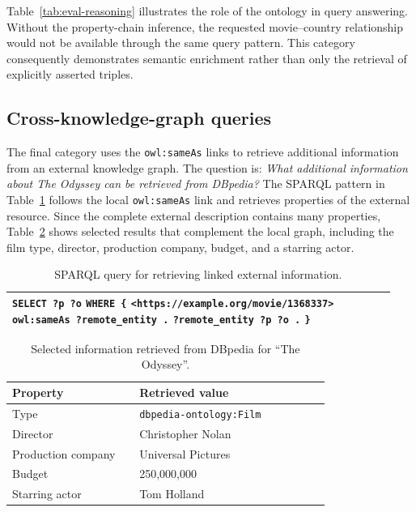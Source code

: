 Table~\ref{tab:eval-reasoning} illustrates the role of the ontology in
query answering. Without the property-chain inference, the requested
movie--country relationship would not be available through the same query
pattern. This category consequently demonstrates semantic enrichment
rather than only the retrieval of explicitly asserted triples.

\subsection{Cross-knowledge-graph queries}

The final category uses the \texttt{owl:sameAs} links to retrieve additional
information from an external knowledge graph. The question is: \emph{What
additional information about The Odyssey can be retrieved from DBpedia?}
The SPARQL pattern in Table~\ref{tab:sparql-external} follows the local
\texttt{owl:sameAs} link and retrieves properties of the external resource.
Since the complete external description contains many properties,
Table~\ref{tab:eval-external} shows selected results that complement the
local graph, including the film type, director, production company, budget,
and a starring actor.

\begin{table}[!htbp]
    \centering
    \caption{SPARQL query for retrieving linked external information.}
    \label{tab:sparql-external}
    \small
    \begin{tabular}{p{0.94\linewidth}}
        \toprule
        \texttt{SELECT ?p ?o} \newline
        \texttt{WHERE \{} \newline
        \texttt{\quad <https://example.org/movie/1368337>} \newline
        \texttt{\quad\quad owl:sameAs ?remote\_entity .} \newline
        \texttt{\quad ?remote\_entity ?p ?o .} \newline
        \texttt{\}} \\
        \bottomrule
    \end{tabular}
\end{table}

\begin{table}[!htbp]
    \centering
    \caption{Selected information retrieved from DBpedia for ``The Odyssey''.}
    \label{tab:eval-external}
    \small
    \begin{tabular}{p{0.36\linewidth}p{0.54\linewidth}}
        \toprule
        \textbf{Property} & \textbf{Retrieved value} \\
        \midrule
        Type & \texttt{dbpedia-ontology:Film} \\
        Director & Christopher Nolan \\
        Production company & Universal Pictures \\
        Budget & 250,000,000 \\
        Starring actor & Tom Holland \\
        \bottomrule
    \end{tabular}
\end{table}

